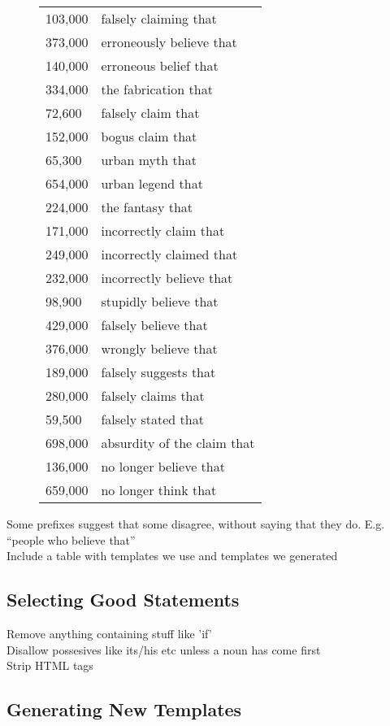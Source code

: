 \documentclass{www2010-submission}
\newcommand{\x}[1]{{\color{blue} #1}\\}
\begin{document}
\begin{figure}[tb]
\begin{tabular}{|ll|}
    103,000 & falsely claiming that \\
    373,000 & erroneously believe that \\
    140,000 & erroneous belief that \\
    334,000 & the fabrication that \\
    72,600 & falsely claim that \\
    152,000 & bogus claim that \\
    65,300 & urban myth that \\
    654,000 & urban legend that \\
    224,000 & the fantasy that \\
    171,000 & incorrectly claim that \\
    249,000 & incorrectly claimed that \\
    232,000 & incorrectly believe that \\
    98,900 & stupidly believe that \\
    429,000 & falsely believe that \\
    376,000 & wrongly believe that \\
    189,000 & falsely suggests that \\
    280,000 & falsely claims that \\
    59,500 & falsely stated that \\
    698,000 & absurdity of the claim that \\
    136,000 & no longer believe that \\
    659,000 & no longer think that \\
    \hline
  \end{tabular}
 
\end{figure}

\x{Some prefixes suggest that some disagree, without saying that they do. E.g. ``people who believe that''}

\x{Include a table with templates we use and templates we generated}

\subsection{Selecting Good Statements}

\x{Remove anything containing stuff like 'if'}
\x{Disallow possesives like its/his etc unless a noun has come first}
\x{Strip HTML tags}

\subsection{Generating New Templates}
\end{document}
